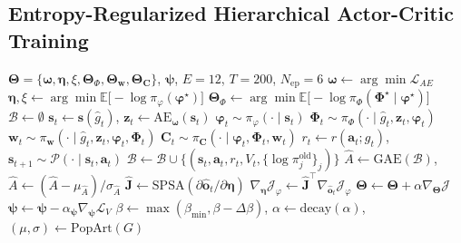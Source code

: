 \documentclass[12pt,onecolumn]{IEEEtran}
\newif\iffull
\newcommand{\fullonly}[1]{\iffull #1\fi}
\begin{document}
\subsection{Entropy-Regularized Hierarchical Actor-Critic Training}
\label{sec:training}
\begin{algorithm}[t]
\caption{HQC-HAC training}
\label{alg:hqchac}
\small
\begin{algorithmic}[1]
\Require $\boldsymbol{\Theta}=\{\boldsymbol{\omega},\boldsymbol{\eta},\xi,\boldsymbol{\Theta}_{\Phi},\boldsymbol{\Theta}_{\mathbf{w}},\boldsymbol{\Theta}_{\mathbf{C}}\}$, $\boldsymbol{\psi}$, $E{=}12$, $T{=}200$, $N_{\mathrm{ep}}{=}6$
\State $\boldsymbol{\omega} \gets \arg\min \mathcal{L}_{AE}$ 
\State $\boldsymbol{\eta},\xi \gets \arg\min \mathbb{E}\bigl[-\log\pi_{\varphi}(\boldsymbol{\varphi}^{\star})\bigr]$
\State $\boldsymbol{\Theta}_{\Phi} \gets \arg\min \mathbb{E}\bigl[-\log\pi_{\Phi}(\boldsymbol{\Phi}^{\star}\mid\boldsymbol{\varphi}^{\star})\bigr]$
\Repeat
  \State $\mathcal{B} \gets \emptyset$
      \State $\mathbf{s}_t \gets \mathbf{s}(\hat{g}_t)$\fullonly{~\eqref{eq:affinity}}, \enspace $\mathbf{z}_t \gets \mathrm{AE}_{\boldsymbol{\omega}}(\mathbf{s}_t)$
      \State $\boldsymbol{\varphi}_t \sim \pi_{\varphi}(\cdot \mid \mathbf{s}_t)$\fullonly{~\eqref{eq:pi_k}}
      \State $\boldsymbol{\Phi}_t \sim \pi_{\Phi}(\cdot \mid \hat{g}_t, \mathbf{z}_t, \boldsymbol{\varphi}_t)$
      \State $\mathbf{w}_t \sim \pi_{\mathbf{w}}(\cdot \mid \hat{g}_t, \mathbf{z}_t, \boldsymbol{\varphi}_t, \boldsymbol{\Phi}_t)$
      \State $\mathbf{C}_t \sim \pi_{\mathbf{C}}(\cdot \mid \boldsymbol{\varphi}_t, \boldsymbol{\Phi}_t, \mathbf{w}_t)$
      \State $r_t \gets r(\mathbf{a}_t; g_t)$\fullonly{~\eqref{eq:reward}}, \enspace $\mathbf{s}_{t+1} \sim \mathcal{P}(\cdot \mid \mathbf{s}_t, \mathbf{a}_t)$
      \State $\mathcal{B} \gets \mathcal{B} \cup \bigl\{(\mathbf{s}_t, \mathbf{a}_t, r_t, V_t, \{\log \pi_j^{\mathrm{old}}\}_j)\bigr\}$
    \EndFor
  \EndFor
  \State $\hat{A} \gets \mathrm{GAE}(\mathcal{B})$\fullonly{~\eqref{eq:gae}}, \enspace $\hat{A} \gets (\hat{A}-\mu_{\hat{A}})/\sigma_{\hat{A}}$
      \State $\hat{\mathbf{J}} \gets \mathrm{SPSA}(\partial \hat{\mathbf{o}}_t / \partial \boldsymbol{\eta})$\fullonly{~\eqref{eq:spsa}}
      \State $\nabla_{\boldsymbol{\eta}}\mathcal{J}_{\varphi} \gets \hat{\mathbf{J}}^{\top} \nabla_{\hat{\mathbf{o}}_t}\mathcal{J}_{\varphi}$
      \State $\boldsymbol{\Theta} \gets \boldsymbol{\Theta} + \alpha \nabla_{\boldsymbol{\Theta}} \mathcal{J}$\fullonly{~\eqref{eq:actor_obj}}
      \State $\boldsymbol{\psi} \gets \boldsymbol{\psi} - \alpha_{\boldsymbol{\psi}} \nabla_{\boldsymbol{\psi}} \mathcal{L}_V$\fullonly{~\eqref{eq:critic_loss}}
    \EndFor
  \EndFor
  \State $\beta \gets \max(\beta_{\min}, \beta - \Delta\beta)$, \enspace $\alpha \gets \mathrm{decay}(\alpha)$, \enspace $(\mu,\sigma) \gets \mathrm{PopArt}(G)$
\end{algorithmic}
\end{algorithm}
\end{document}
